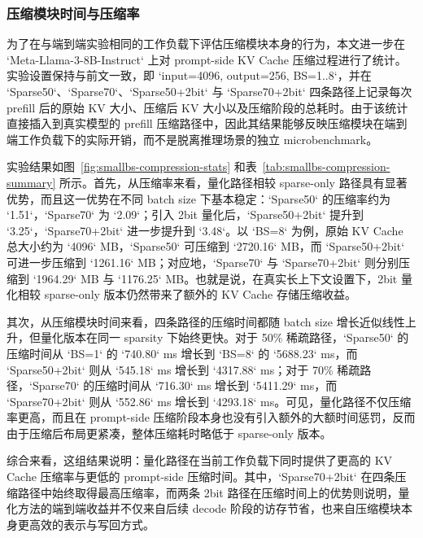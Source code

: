 \subsubsection{压缩模块时间与压缩率}

为了在与端到端实验相同的工作负载下评估压缩模块本身的行为，本文进一步在 `Meta-Llama-3-8B-Instruct` 上对 prompt-side KV Cache 压缩过程进行了统计。实验设置保持与前文一致，即 `input=4096, output=256, BS=1..8`，并在 `Sparse50`、`Sparse70`、`Sparse50+2bit` 与 `Sparse70+2bit` 四条路径上记录每次 prefill 后的原始 KV 大小、压缩后 KV 大小以及压缩阶段的总耗时。由于该统计直接插入到真实模型的 prefill 压缩路径中，因此其结果能够反映压缩模块在端到端工作负载下的实际开销，而不是脱离推理场景的独立 microbenchmark。

实验结果如图~\ref{fig:smallbs-compression-stats} 和表~\ref{tab:smallbs-compression-summary} 所示。首先，从压缩率来看，量化路径相较 sparse-only 路径具有显著优势，而且这一优势在不同 batch size 下基本稳定：`Sparse50` 的压缩率约为 `1.51\times`，`Sparse70` 为 `2.09\times`；引入 2bit 量化后，`Sparse50+2bit` 提升到 `3.25\times`，`Sparse70+2bit` 进一步提升到 `3.48\times`。以 `BS=8` 为例，原始 KV Cache 总大小约为 `4096` MB，`Sparse50` 可压缩到 `2720.16` MB，而 `Sparse50+2bit` 可进一步压缩到 `1261.16` MB；对应地，`Sparse70` 与 `Sparse70+2bit` 则分别压缩到 `1964.29` MB 与 `1176.25` MB。也就是说，在真实长上下文设置下，2bit 量化相较 sparse-only 版本仍然带来了额外的 KV Cache 存储压缩收益。

其次，从压缩模块时间来看，四条路径的压缩时间都随 batch size 增长近似线性上升，但量化版本在同一 sparsity 下始终更快。对于 50\% 稀疏路径，`Sparse50` 的压缩时间从 `BS=1` 的 `740.80` ms 增长到 `BS=8` 的 `5688.23` ms，而 `Sparse50+2bit` 则从 `545.18` ms 增长到 `4317.88` ms；对于 70\% 稀疏路径，`Sparse70` 的压缩时间从 `716.30` ms 增长到 `5411.29` ms，而 `Sparse70+2bit` 则从 `552.86` ms 增长到 `4293.18` ms。可见，量化路径不仅压缩率更高，而且在 prompt-side 压缩阶段本身也没有引入额外的大额时间惩罚，反而由于压缩后布局更紧凑，整体压缩耗时略低于 sparse-only 版本。

综合来看，这组结果说明：量化路径在当前工作负载下同时提供了更高的 KV Cache 压缩率与更低的 prompt-side 压缩时间。其中，`Sparse70+2bit` 在四条压缩路径中始终取得最高压缩率，而两条 2bit 路径在压缩时间上的优势则说明，量化方法的端到端收益并不仅来自后续 decode 阶段的访存节省，也来自压缩模块本身更高效的表示与写回方式。

\begin{table}[t]
    \centering
    \caption{代表性 batch size 下的 KV Cache 压缩率与压缩时间（input=4096）}
    \label{tab:smallbs-compression-summary}
    
\end{table}

